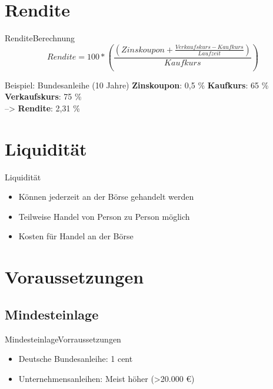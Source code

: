 \documentclass[10pt,a4paper, ngerman]{beamer}
\begin{document}
\section{Rendite}
\begin{frame}{Rendite}{Berechnung}
\[Rendite = 100*\left ( \frac{\left ( Zinskoupon + \frac{Verkaufskurs - Kaufkurs}{Laufzeit} \right )}{Kaufkurs} \right )\]
\pause
\begin{block}{Beispiel: Bundesanleihe (10 Jahre)}
\textbf{Zinskoupon}: 0,5 \% \textbf{Kaufkurs}: 65 \% \textbf{Verkaufskurs}: 75 \% \\
--> \textbf{Rendite}: 2,31 \%
\end{block}
\end{frame}

\section{Liquidität}
\begin{frame}{Liquidität}
\begin{itemize}
	\item Können jederzeit an der Börse gehandelt werden
	\item Teilweise Handel von Person zu Person möglich \pause
	\item Kosten für Handel an der Börse
\end{itemize}
\end{frame}

%

\section{Voraussetzungen}
\subsection{Mindesteinlage}
\begin{frame}{Mindesteinlage}{Vorraussetzungen}
\begin{itemize}
	\item Deutsche Bundesanleihe: 1 cent
	\item Unternehmensanleihen: Meist höher (>20.000 \euro)
\end{itemize}
\end{frame}
\end{document}
